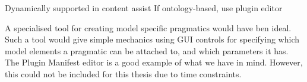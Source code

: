Dynamically supported in content assist 
If ontology-based, use plugin editor
	
A specialised tool for creating model specific pragmatics would have ben ideal.
Such a tool would give simple mechanics using GUI controls for specifying which
model elements a pragmatic can be attached to, and which parameters it has. The
Plugin Manifest editor is a good example of what we have in mind. However, this
could not be included for this thesis due to time constraints.
	

